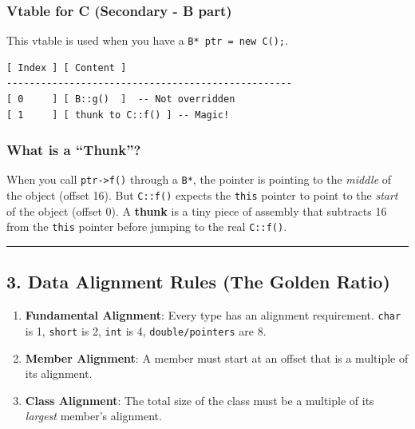 \hypertarget{vtable-for-c-secondary---b-part}{%
\subsubsection{Vtable for C (Secondary - B
part)}\label{vtable-for-c-secondary---b-part}}

This vtable is used when you have a
\passthrough{\lstinline!B* ptr = new C();!}.

\begin{lstlisting}
[ Index ] [ Content ]
--------------------------------------------------
[ 0     ] [ B::g()  ]  -- Not overridden
[ 1     ] [ thunk to C::f() ] -- Magic!
\end{lstlisting}

\hypertarget{what-is-a-thunk}{%
\subsubsection{What is a ``Thunk''?}\label{what-is-a-thunk}}

When you call \passthrough{\lstinline!ptr->f()!} through a
\passthrough{\lstinline!B*!}, the pointer is pointing to the
\emph{middle} of the object (offset 16). But
\passthrough{\lstinline!C::f()!} expects the
\passthrough{\lstinline!this!} pointer to point to the \emph{start} of
the object (offset 0). A \textbf{thunk} is a tiny piece of assembly that
subtracts 16 from the \passthrough{\lstinline!this!} pointer before
jumping to the real \passthrough{\lstinline!C::f()!}.

\begin{center}\rule{0.5\linewidth}{0.5pt}\end{center}

\hypertarget{data-alignment-rules-the-golden-ratio}{%
\subsection{3. Data Alignment Rules (The Golden
Ratio)}\label{data-alignment-rules-the-golden-ratio}}

\begin{enumerate}
\def\labelenumi{\arabic{enumi}.}
\tightlist
\item
  \textbf{Fundamental Alignment}: Every type has an alignment
  requirement. \passthrough{\lstinline!char!} is 1,
  \passthrough{\lstinline!short!} is 2, \passthrough{\lstinline!int!} is
  4, \passthrough{\lstinline!double/pointers!} are 8.
\item
  \textbf{Member Alignment}: A member must start at an offset that is a
  multiple of its alignment.
\item
  \textbf{Class Alignment}: The total size of the class must be a
  multiple of its \emph{largest} member's alignment.
\end{enumerate}

